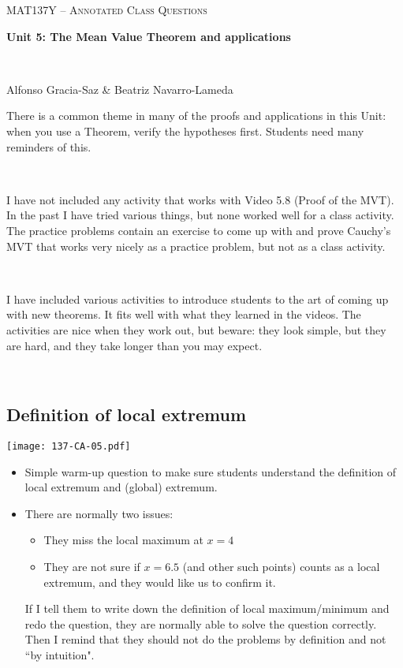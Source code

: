 \documentclass[11pt]{article}
\newcommand{\nl}{\hfill \vspace{-1.1\baselineskip}} %
\begin{document}
\thispagestyle{empty}
	\begin{center}
		{ {\LARGE  \scshape
		\textcolor{137cp3}{MAT137Y --   Annotated Class Questions}
		}
		
		\medskip
		{\bf \Large \textcolor{137cp1}{Unit 5: The Mean Value Theorem and applications
		}}
		
		\
		
		\medskip
		{\large
		\textcolor{137cp1}{Alfonso Gracia-Saz \& Beatriz Navarro-Lameda}
		}}
	\end{center}

\vspace{5mm}


There is a common theme in many of the proofs and applications in this Unit: when you use a Theorem, verify the hypotheses first.  Students need many reminders of this.

\

I have not included any activity that works with Video 5.8 (Proof of the MVT).  In the past I have tried various things, but none worked well for a class activity.  The practice problems contain an exercise to come up with and prove Cauchy's MVT that works very nicely as a practice problem, but not as a class activity.

\

I have included various activities to introduce students to the art of coming up with new theorems.  It fits well with what they learned in the videos. The activities are nice when they work out, but beware: they look simple, but they are hard, and they take longer than you may expect.

\

\tableofcontents

\newpage

\subsection{Definition of local extremum}

\begin{center}
{ \texttt{[image: 137-CA-05.pdf]}} 
\end{center}


\begin{comments}
\nl
\begin{itemize}
\item Simple warm-up question to make sure students understand the definition of local extremum and (global) extremum.
\item There are normally two issues:
	\begin{itemize}
		\item  They miss the local maximum at $x=4$
		\item They are not sure if $x=6.5$ (and other such points) counts as a local extremum, and they would like us to confirm it.
	\end{itemize}
	If I tell them to write down the definition of local maximum/minimum and redo the question, they are normally able to solve the question correctly.  Then I remind that they should not do the problems by definition and not ``by intuition".
\end{itemize}	
\end{comments}
\end{document}
